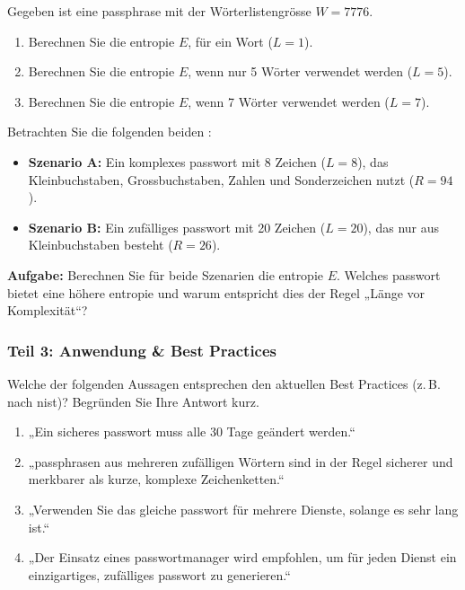 \documentclass[12pt,a4paper]{article}
\begin{document}
\begin{taskbox}
Gegeben ist eine \gls{passphrase} mit der Wörterlistengrösse $W = 7776$.
\begin{enumerate}[label=\alph*)]
    \item Berechnen Sie die \gls{entropie} $E$, für ein Wort ($L = 1$).
    \item Berechnen Sie die \gls{entropie} $E$, wenn nur 5 Wörter verwendet werden \newline($L = 5$).
    \item Berechnen Sie die \gls{entropie} $E$, wenn 7 Wörter verwendet werden ($L = 7$).
\end{enumerate}
\end{taskbox}

\begin{taskbox}
Betrachten Sie die folgenden beiden :
\begin{itemize}
    \item \textbf{Szenario A:} Ein komplexes \gls{passwort} mit 8 Zeichen ($L = 8$), \newline das \mbox{Kleinbuchstaben}, \mbox{Grossbuchstaben}, \mbox{Zahlen} und \mbox{Sonderzeichen} nutzt \newline($R = 94$).
    \item \textbf{Szenario B:} Ein zufälliges \gls{passwort} mit 20 Zeichen ($L = 20$), das nur aus Kleinbuchstaben besteht ($R = 26$).
\end{itemize}
\textbf{Aufgabe:} Berechnen Sie für beide Szenarien die \gls{entropie} $E$. Welches \gls{passwort} bietet eine höhere \gls{entropie} und warum entspricht dies der Regel „Länge vor \mbox{Komplexität}“?
\end{taskbox}

\subsubsection{Teil 3: Anwendung \& Best Practices}

\begin{taskbox}
Welche der folgenden Aussagen entsprechen den aktuellen Best Practices \newline(z.\,B. nach \gls{nist})? Begründen Sie Ihre Antwort kurz.
\begin{enumerate}[label=\Alph*)]
    \item „Ein sicheres \gls{passwort} muss alle 30 Tage geändert werden.“
    \item „\gls{passphrase}n aus mehreren zufälligen Wörtern sind in der Regel sicherer und merkbarer als kurze, komplexe Zeichenketten.“
    \item „Verwenden Sie das gleiche \gls{passwort} für mehrere Dienste, solange es sehr lang ist.“
    \item „Der Einsatz eines \gls{passwortmanager} wird empfohlen, um für jeden Dienst ein einzigartiges, zufälliges \gls{passwort} zu generieren.“
\end{enumerate}
\end{taskbox}
\end{document}
